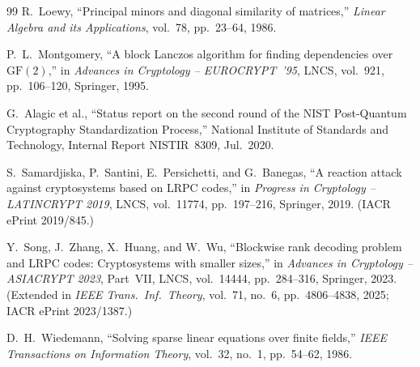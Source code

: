 \documentclass[11pt,a4paper]{article}
\theoremstyle{definition}
\theoremstyle{remark}
\begin{document}
\begin{thebibliography}{99}
R.~Loewy,
``Principal minors and diagonal similarity of matrices,'' \emph{Linear Algebra and its Applications}, vol.~78, pp.~23--64, 1986.

P.~L.~Montgomery,
``A block Lanczos algorithm for finding dependencies over $\mathrm{GF}(2)$,'' in \emph{Advances in Cryptology -- EUROCRYPT~'95}, LNCS, vol.~921, pp.~106--120, Springer, 1995.

G.~Alagic et al.,
``Status report on the second round of the NIST Post-Quantum Cryptography Standardization Process,'' National Institute of Standards and Technology, Internal Report NISTIR~8309, Jul.~2020.

S.~Samardjiska, P.~Santini, E.~Persichetti, and G.~Banegas,
``A reaction attack against cryptosystems based on LRPC codes,'' in \emph{Progress in Cryptology -- LATINCRYPT 2019}, LNCS, vol.~11774, pp.~197--216, Springer, 2019. (IACR ePrint 2019/845.)

Y.~Song, J.~Zhang, X.~Huang, and W.~Wu,
``Blockwise rank decoding problem and LRPC codes: Cryptosystems with smaller sizes,'' in \emph{Advances in Cryptology -- ASIACRYPT 2023}, Part~VII, LNCS, vol.~14444, pp.~284--316, Springer, 2023. (Extended in \emph{IEEE Trans.\ Inf.\ Theory}, vol.~71, no.~6, pp.~4806--4838, 2025; IACR ePrint 2023/1387.)

D.~H.~Wiedemann,
``Solving sparse linear equations over finite fields,'' \emph{IEEE Transactions on Information Theory}, vol.~32, no.~1, pp.~54--62, 1986.

\end{thebibliography}
\end{document}
